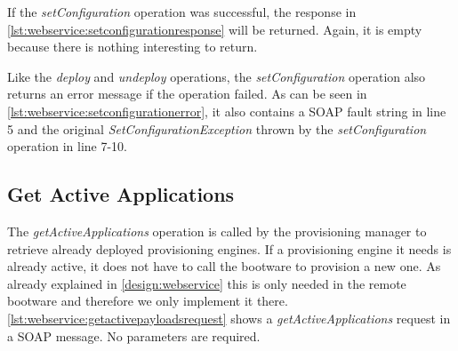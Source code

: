 \vspace*{\baselineskip}

If the \textit{setConfiguration} operation was successful, the response in \autoref{lst:webservice:setconfigurationresponse} will be returned.
Again, it is empty because there is nothing interesting to return.

\vspace*{\baselineskip}

Like the \textit{deploy} and \textit{undeploy} operations, the \textit{setConfiguration} operation also returns an error message if the operation failed.
As can be seen in \autoref{lst:webservice:setconfigurationerror}, it also contains a SOAP fault string in line 5 and the original \textit{SetConfigurationException} thrown by the \textit{setConfiguration} operation in line 7-10.

\vspace*{\baselineskip}

\subsection{Get Active Applications}

The \textit{getActiveApplications} operation is called by the provisioning manager to retrieve already deployed provisioning engines.
If a provisioning engine it needs is already active, it does not have to call the bootware to provision a new one.
As already explained in \autoref{design:webservice} this is only needed in the remote bootware and therefore we only implement it there.
\autoref{lst:webservice:getactivepayloadsrequest} shows a \textit{getActiveApplications} request in a SOAP message.
No parameters are required.

